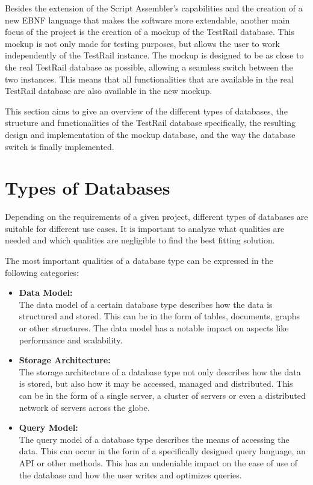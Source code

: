 Besides the extension of the Script Assembler's capabilities and the creation of a new EBNF language that makes the software more extendable, another main focus of the project is the creation of a mockup of the TestRail database. This mockup is not only made for testing purposes, but allows the user to work independently of the TestRail instance. The mockup is designed to be as close to the real TestRail database as possible, allowing a seamless switch between the two instances. This means that all functionalities that are available in the real TestRail database are also available in the new mockup.

This section aims to give an overview of the different types of databases, the structure and functionalities of the TestRail database specifically, the resulting design and implementation of the mockup database, and the way the database switch is finally implemented.

\section{Types of Databases}

Depending on the requirements of a given project, different types of databases are suitable for different use cases. It is important to analyze what qualities are needed and which qualities are negligible to find the best fitting solution. 

The most important qualities of a database type can be expressed in the following categories:

\begin{itemize}
    \item \textbf{Data Model:} \\
    The data model of a certain database type describes how the data is structured and stored. This can be in the form of tables, documents, graphs or other structures. The data model has a notable impact on aspects like performance and scalability.

    \item \textbf{Storage Architecture:} \\
    The storage architecture of a database type not only describes how the data is stored, but also how it may be accessed, managed and distributed. This can be in the form of a single server, a cluster of servers or even a distributed network of servers across the globe.

    \item \textbf{Query Model:} \\
    The query model of a database type describes the means of accessing the data. This can occur in the form of a specifically designed query language, an API or other methods. This has an undeniable impact on the ease of use of the database and how the user writes and optimizes queries.
\end{itemize}

